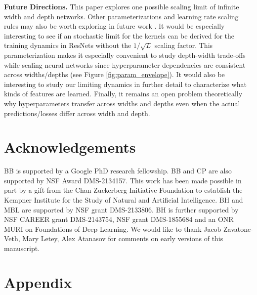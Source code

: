 \documentclass{article} %
\begin{document}
\textbf{Future Directions.} This paper explores one possible scaling limit of infinite width and depth networks. Other parameterizations and learning rate scaling rules may also be worth exploring in future work \citep{jelassi2023depth, li2022neural, noci2023shaped}. 
% 
It would be especially interesting to see if an stochastic limit for the kernels can be derived for the training dynamics in ResNets without the $1/\sqrt{L}$ scaling factor. This parameterization makes it especially convenient to study depth-width trade-offs while scaling neural networks since hyperparameter dependencies are consistent across widths/depths (see Figure \ref{fig:param_envelope}). 
% 
It would also be interesting to study our limiting dynamics in further detail to characterize what kinds of features are learned. 
% 
Finally, it remains an open problem theoretically why hyperparameters transfer across widths and depths even when the actual predictions/losses differ across width and depth.  



\section*{Acknowledgements}

BB is supported by a Google PhD research fellowship. BB and CP are also supported by NSF Award DMS-2134157. This work has been made possible in part by a gift from the Chan Zuckerberg Initiative Foundation to establish the Kempner Institute for the Study of Natural and Artificial Intelligence. BH and MBL are supported by NSF grant DMS-2133806. BH is further supported by NSF CAREER grant DMS-2143754, NSF grant DMS-1855684 and an ONR MURI on Foundations of Deep Learning. We would like to thank Jacob Zavatone-Veth, Mary Letey, Alex Atanasov for comments on early versions of this manuscript. 





\vfill
\pagebreak

\appendix
{}

\section*{Appendix}
\end{document}
